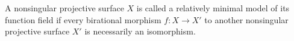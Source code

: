 A nonsingular projective surface $X$ is called a relatively minimal model of its function field if every birational morphism $f: X \rightarrow X'$ to another nonsingular projective surface $X'$ is necessarily an isomorphism.
